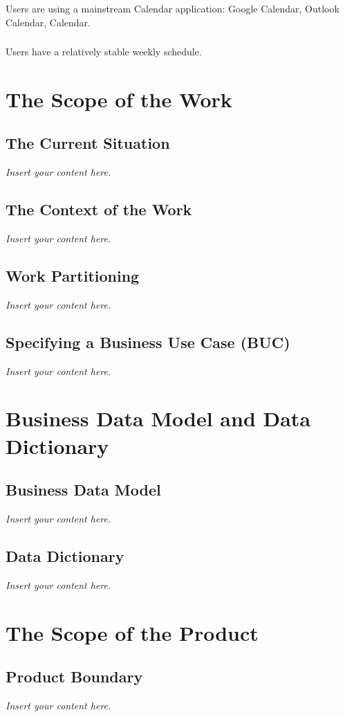 \documentclass[12pt]{article}
\newcommand{\lips}{\textit{Insert your content here.}}
\begin{document}
\subsubsection{}
Users are using a mainstream Calendar application: Google Calendar, Outlook Calendar, Calendar.
\subsubsection{}
Users have a relatively stable weekly schedule.

\section{The Scope of the Work}
\subsection{The Current Situation}
\lips
\subsection{The Context of the Work}
\lips
\subsection{Work Partitioning}
\lips
\subsection{Specifying a Business Use Case (BUC)}
\lips

\section{Business Data Model and Data Dictionary}
\subsection{Business Data Model}
\lips
\subsection{Data Dictionary}
\lips

\section{The Scope of the Product}
\subsection{Product Boundary}
\lips
\end{document}
